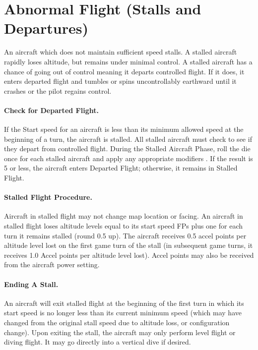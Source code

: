 \section{Abnormal Flight (Stalls and Departures)}
\label{rule:abnormal-flight}


An aircraft which does not maintain sufficient speed stalls. A stalled aircraft rapidly loses altitude, but remains under minimal control. A stalled aircraft has a chance of going out of control meaning it departs controlled flight. If it does, it enters departed flight and tumbles or spins uncontrollably earthward until it crashes or the pilot regains control.

\paragraph{Check for Departed Flight.} If the Start speed for an aircraft is less than its minimum allowed speed at the beginning of a turn, the aircraft is stalled. All stalled aircraft must check to see if they depart from controlled flight. During the Stalled Aircraft Phase, roll the die once for each stalled aircraft and apply any appropriate modifiers . If the result is 5 or less, the aircraft enters Departed Flight; otherwise, it remains in Stalled Flight.

\paragraph{Stalled Flight Procedure.} Aircraft in stalled flight may not change map location or facing. An aircraft in stalled flight loses altitude levels equal to its start speed FPs plus one for each turn it remains stalled (round 0.5 up). The aircraft receives 0.5 accel points per altitude level lost on the first game turn of the stall (in subsequent game turns, it receives 1.0 Accel points per altitude level lost). Accel points may also be received from the aircraft power setting.

\paragraph{Ending A Stall.} An aircraft will exit stalled flight at the beginning of the first turn in which its start speed is no longer less than its current minimum speed (which may have changed from the original stall speed due to altitude loss, or configuration change). Upon exiting the stall, the aircraft may only perform level flight or diving flight. It may go directly into a vertical dive if desired. 

